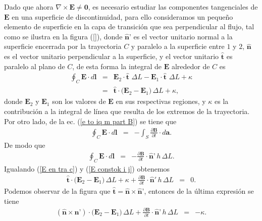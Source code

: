 \documentclass[11pt,fleqn]{book} %
\begin{document}
Dado que ahora $\nabla\times\textbf{E}\neq \textbf{0}$, es necesario estudiar las componentes tangenciales de $\textbf{E}$ en una superficie de discontinuidad, para ello consideramos un peque\~no elemento de superficie en la capa de transici\'on que sea perpendicular al flujo, tal como se ilustra en la figura (\ref{}), donde $\hat{\textbf{n}}\textbf{'}$ es el vector unitario normal a la superficie encerrada por la trayectoria $C$ y paralelo a la superficie entre $1$ y $2$, $\hat{\textbf{n}}$ es el vector unitario perpendicular a la  superficie, y el vector unitario $\hat{\textbf{t}}$ es paralelo al plano de $C$, de esta forma la integral de $\textbf{E}$ alrededor de $C$ es
\begin{eqnarray}
\oint_C\textbf{E}\cdot d\textbf{l}&=&\textbf{E}_2\cdot\hat{\textbf{t}}\,\,\Delta L-\textbf{E}_1\cdot\hat{\textbf{t}}\,\,\Delta L+ \kappa\nonumber\\
&=&\hat{\textbf{t}}\cdot\big(\textbf{E}_2-\textbf{E}_1\big)\,\Delta L+\kappa,\label{E en tra c}
\end{eqnarray}
donde $\textbf{E}_2$ y $\textbf{E}_1$ son los valores de $\textbf{E}$ en sus respectivas regiones, y $\kappa$ es la contribuci\'on a la integral de l\'inea que resulta de los extremos de la trayectoria.
Por otro lado, de la ec. (\ref{e to iq m part B}) se tiene que
\begin{eqnarray}
\oint_C\textbf{E}\cdot d\textbf{l}&=&-\int_S\frac{\partial\textbf{B}}{\partial t}\cdot d\textbf{a}.
\end{eqnarray}
De modo que
\begin{eqnarray}
\oint_C\textbf{E}\cdot d\textbf{l}&=&-\frac{\partial\textbf{B}}{\partial t}\cdot\hat{\textbf{n}}\textbf{'}\,h\,\Delta L.\label{E constok i j}
\end{eqnarray}
Igualando (\ref{E en tra c}) y (\ref{E constok i j}) obtenemos
\begin{eqnarray}
\hat{\textbf{t}}\cdot\big(\textbf{E}_2-\textbf{E}_1\big)\,\Delta L+\kappa+\frac{\partial\textbf{B}}{\partial t}\cdot\hat{\textbf{n}}'\,h\,\Delta L&=&0.
\end{eqnarray}
Podemos observar de la figura que $\hat{\textbf{t}}=\hat{\textbf{n}}\times\hat{\textbf{n}}\textbf{'}$, entonces de la \'ultima expresi\'on se tiene
\begin{eqnarray}
(\hat{\textbf{n}}\times\hat{\textbf{n}}\textbf{'})\cdot\big(\textbf{E}_2-\textbf{E}_1\big)\,\Delta L+\frac{\partial\textbf{B}}{\partial t}\cdot\hat{\textbf{n}}\textbf{'}\,h\,\Delta L&=&-\kappa.
\end{eqnarray}
\end{document}
